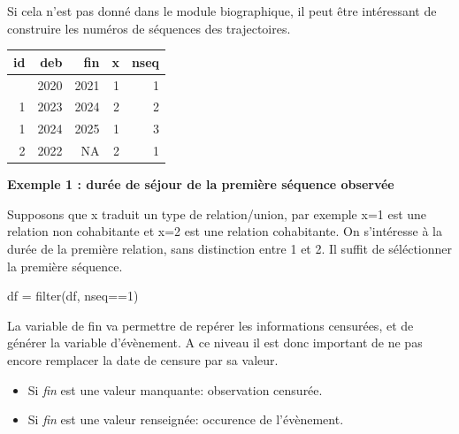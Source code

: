 \documentclass[
  12pt,
  letterpaper,
  DIV=11,
  numbers=noendperiod,
  onepage,
  openany]{scrreprt}
\newenvironment{Shaded}{\begin{snugshade}}{\end{snugshade}}
\newcommand{\AttributeTok}[1]{\textcolor[rgb]{0.80,0.80,0.80}{#1}}
\newcommand{\DecValTok}[1]{\textcolor[rgb]{0.86,0.86,0.80}{#1}}
\newcommand{\FunctionTok}[1]{\textcolor[rgb]{0.94,0.94,0.56}{#1}}
\newcommand{\NormalTok}[1]{\textcolor[rgb]{0.80,0.80,0.80}{#1}}
\newcommand{\OtherTok}[1]{\textcolor[rgb]{0.94,0.94,0.56}{#1}}
\newcommand{\SpecialCharTok}[1]{\textcolor[rgb]{0.86,0.64,0.64}{#1}}
\providecommand{\tightlist}{%
  \setlength{\itemsep}{0pt}\setlength{\parskip}{0pt}}\usepackage{longtable,booktabs,array}
\begin{document}
Si cela n'est pas donné dans le module biographique, il peut être
intéressant de construire les numéros de séquences des trajectoires.

\begin{Shaded}
\end{Shaded}

\begin{longtable}[]{@{}rrrrr@{}}
\toprule\noalign{}
id & deb & fin & x & nseq \\
\midrule\noalign{}
\endhead
\bottomrule\noalign{}
\endlastfoot
1 & 2020 & 2021 & 1 & 1 \\
1 & 2023 & 2024 & 2 & 2 \\
1 & 2024 & 2025 & 1 & 3 \\
2 & 2022 & NA & 2 & 1 \\
\end{longtable}

\textbf{Exemple 1 : durée de séjour de la première séquence observée}

Supposons que x traduit un type de relation/union, par exemple x=1 est
une relation non cohabitante et x=2 est une relation cohabitante. On
s'intéresse à la durée de la première relation, sans distinction entre 1
et 2. Il suffit de séléctionner la première séquence.

\begin{Shaded}
\begin{Highlighting}[]
\NormalTok{df }\OtherTok{=} \FunctionTok{filter}\NormalTok{(df, nseq}\SpecialCharTok{==}\DecValTok{1}\NormalTok{)}
\end{Highlighting}
\end{Shaded}

La variable de fin va permettre de repérer les informations censurées,
et de générer la variable d'évènement. A ce niveau il est donc important
de ne pas encore remplacer la date de censure par sa valeur.

\begin{itemize}
\tightlist
\item
  Si \emph{fin} est une valeur manquante: observation censurée.
\item
  Si \emph{fin} est une valeur renseignée: occurence de l'évènement.
\end{itemize}
\end{document}
